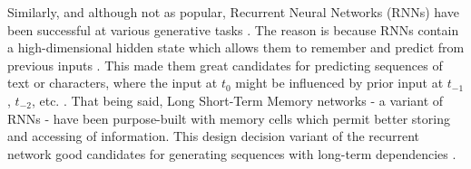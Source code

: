 \documentclass[a4paper]{book}
\begin{document}
Similarly, and although not as popular, Recurrent Neural Networks (RNNs) have been successful at various generative tasks \parencite{jenal_rnn-based_2019, ICML2011Sutskever_524}. The reason is because RNNs contain a high-dimensional hidden state which allows them to remember and predict from previous inputs \parencite{ICML2011Sutskever_524}. This made them great candidates for predicting sequences \parencite{graves_generating_2013} of text or characters, where the input at $t_0$ might be influenced by prior input at $t_{-1}$, $t_{-2}$, etc. \parencite{fan_tts_2014}. That being said, Long Short-Term Memory networks \parencite[LSTM;][]{hochreiter_long_1997} - a variant of RNNs - have been purpose-built with memory cells which permit better storing and accessing of information. This design decision variant of the recurrent network good candidates for generating sequences with long-term dependencies \parencite{graves_generating_2013}.
\end{document}
